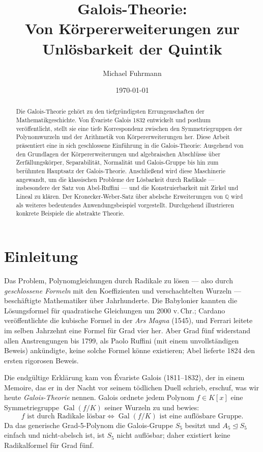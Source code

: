 \documentclass[12pt,a4paper]{amsart}
\title{Galois-Theorie:\\
       Von Körpererweiterungen zur Unlösbarkeit der Quintik}
\author{Michael Fuhrmann}
\date{\today}
\theoremstyle{definition}
\newcommand{\Q}{\mathbb{Q}}
\newcommand{\Gal}{\operatorname{Gal}}
\begin{document}

\begin{abstract}
Die Galois-Theorie gehört zu den tiefgründigsten Errungenschaften der
Mathematikgeschichte. Von \'{E}variste Galois 1832 entwickelt und posthum
veröffentlicht, stellt sie eine tiefe Korrespondenz zwischen den Symmetriegruppen
der Polynomwurzeln und der Arithmetik von Körpererweiterungen her. Diese Arbeit
präsentiert eine in sich geschlossene Einführung in die Galois-Theorie: Ausgehend
von den Grundlagen der Körpererweiterungen und algebraischen Abschlüsse über
Zerfällungskörper, Separabilität, Normalität und Galois-Gruppe bis hin zum
berühmten Hauptsatz der Galois-Theorie. Anschließend wird diese Maschinerie
angewandt, um die klassischen Probleme der Lösbarkeit durch Radikale — insbesondere
der Satz von Abel-Ruffini — und die Konstruierbarkeit mit Zirkel und Lineal zu
klären. Der Kronecker-Weber-Satz über abelsche Erweiterungen von $\Q$ wird als
weiteres bedeutendes Anwendungsbeispiel vorgestellt. Durchgehend illustrieren
konkrete Beispiele die abstrakte Theorie.
\end{abstract}

\maketitle
\tableofcontents

\section{Einleitung}

Das Problem, Polynomgleichungen durch Radikale zu lösen — also durch
\emph{geschlossene Formeln} mit den Koeffizienten und verschachtelten Wurzeln —
beschäftigte Mathematiker über Jahrhunderte. Die Babylonier kannten die
Lösungsformel für quadratische Gleichungen um 2000 v.\,Chr.; Cardano
veröffentlichte die kubische Formel in der \emph{Ars Magna} (1545), und
Ferrari leitete im selben Jahrzehnt eine Formel für Grad vier her. Aber
Grad fünf widerstand allen Anstrengungen bis 1799, als Paolo Ruffini
(mit einem unvollständigen Beweis) ankündigte, keine solche Formel könne
existieren; Abel lieferte 1824 den ersten rigorosen Beweis.

Die endgültige Erklärung kam von \'{E}variste Galois (1811--1832), der in
einem Memoire, das er in der Nacht vor seinem tödlichen Duell schrieb, erschuf,
was wir heute \emph{Galois-Theorie} nennen. Galois ordnete jedem Polynom
$f \in K[x]$ eine Symmetriegruppe $\Gal(f/K)$ seiner Wurzeln zu und bewies:
\[
  f \text{ ist durch Radikale lösbar} \iff \Gal(f/K) \text{ ist eine auflösbare Gruppe.}
\]
Da das generische Grad-5-Polynom die Galois-Gruppe $S_5$ besitzt und
$A_5 \trianglelefteq S_5$ einfach und nicht-abelsch ist, ist $S_5$ nicht
auflösbar; daher existiert keine Radikalformel für Grad fünf.
\end{document}
